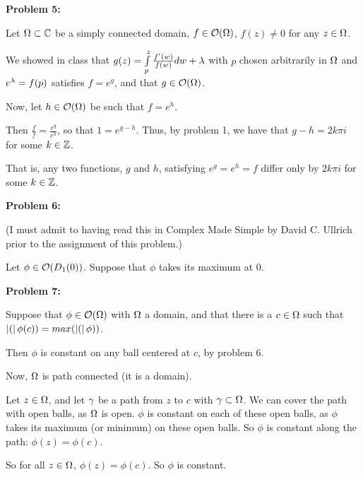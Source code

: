 \documentclass[a4paper,12pt]{article}
\begin{document}

\shunt

{\bf Problem 5:}

Let $\Omega \subset \mathbb{C}$ be a simply connected domain, $f \in \mathcal{O}(\Omega)$, $f(z) \neq 0$ for any $z \in \Omega$.

We showed in class that $g(z) = \int\limits_p^z \frac{f'(w)}{f(w)} dw + \lambda$ with $p$ chosen arbitrarily in $\Omega$ and $e^\lambda = f(p)$ satisfies $f=e^g$, and that $g \in \mathcal{O}(\Omega)$. 

Now, let $h \in \mathcal{O}(\Omega)$ be such that $f=e^h$.

Then $\frac{f}{f} = \frac{e^g}{e^h}$, so that $1 = e^{g-h}$. Thus, by problem 1, we have that $g-h = 2k \pi  i$ for some $k \in \mathbb{Z}$. %

That is, any two functions, $g$ and $h$, satisfying $e^g=e^h=f$ differ only by $2k\pi i $ for some $k \in \mathbb{Z}$.

\shunt

{\bf Problem 6:}

(I must admit to having read this in Complex Made Simple by David C. Ullrich prior to the assignment of this problem.)

Let $\phi \in \mathcal{O}(D_1(0))$. Suppose that $\phi$ takes its maximum at $0$.


\shunt

{\bf Problem 7:}

Suppose that $\phi \in \mathcal{O}(\Omega)$ with $\Omega$ a domain, and that there is a $c \in \Omega$ such that $\left\lvert ( \right\rvert\phi(c)) = max(\left\lvert ( \right\rvert\phi))$.

Then $\phi$ is constant on any ball centered at $c$, by problem 6. %

Now, $\Omega$ is path connected (it is a domain).

Let $z \in \Omega$, and let $\gamma$ be a path from $z$ to $c$ with $\gamma \subset \Omega$. We can cover the path with open balls, as $\Omega$ is open. $\phi$ is constant on each of these open balls, as $\phi$ takes its maximum (or minimum) on these open balls. So $\phi$ is constant along the path: $\phi(z) = \phi(c)$. %

So for all $z \in \Omega$, $\phi(z) = \phi(c)$. So $\phi$ is constant.

\shunt
\end{document}
